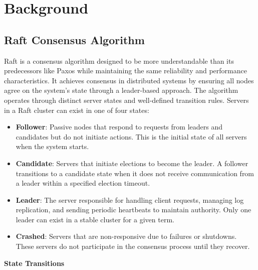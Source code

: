 \documentclass[a4paper]{llncs}
\begin{document}
    \section{Background}
    \label{sec:background}
    \subsection{Raft Consensus Algorithm}
    Raft is a consensus algorithm designed to be more understandable than its
    predecessors like Paxos \cite{Lamport} while maintaining the same reliability and
    performance characteristics. It achieves consensus in distributed systems by
    ensuring all nodes agree on the system's state through a leader-based approach.
    The algorithm operates through distinct server states and well-defined
    transition rules. Servers in a Raft cluster can exist in one of four states\cite{Qx1}:
    \begin{itemize}
        \item {\textbf{Follower}}: Passive nodes that respond to requests from leaders
            and candidates but do not initiate actions. This is the initial
            state of all servers when the system starts.

        \item {\textbf{Candidate}}: Servers that initiate elections to become
            the leader. A follower transitions to a candidate state when it does
            not receive communication from a leader within a specified election timeout.

        \item {\textbf{Leader}}: The server responsible for handling client requests,
            managing log replication, and sending periodic heartbeats to maintain
            authority. Only one leader can exist in a stable cluster for a given
            term.

        \item {\textbf{Crashed}}: Servers that are non-responsive due to
            failures or shutdowns. These servers do not participate in the consensus
            process until they recover.
    \end{itemize}
    \textbf{State Transitions}
\end{document}
